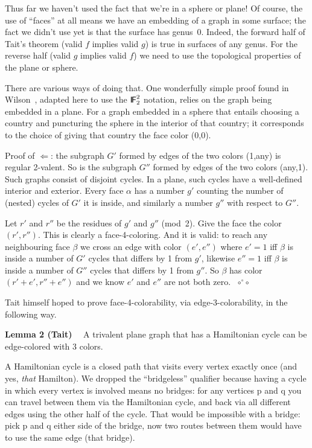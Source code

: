 \documentclass[12pt]{article}
\let\S\scriptstyle
\let\SS\scriptscriptstyle
\def\sfmath#1{{\mathchoice%
{{\sf #1}}{{\sf #1}}{{\S\sf #1}}{{\SS\sf #1}}}}
\def\Stalkset#1{\sfmath{I\kern-.12em#1}}
\def\Fset{\Stalkset F}
\let\os\Longleftarrow
\def\qed{ ${\S\circ}\!{}^\circ\!{\S\circ}$}
\begin{document}
Thus far we haven't used the fact that we're in a sphere or plane!
Of course, the use of ``faces'' at all means we have an embedding of a graph
in some surface; the fact we didn't use yet is that the surface has genus~0.
Indeed, the forward half of Tait's theorem (valid $f$ implies valid $g$)
is true in surfaces of any genus. For the reverse half (valid $g$ implies
valid $f$) we need to use the topological properties of the plane or sphere.

There are various ways of doing that. One wonderfully simple proof found in
Wilson~\cite{Wil02}, adapted here to use the $\Fset_2^2$ notation, relies on
the graph being embedded in a plane. For a graph embedded in a sphere that
entails choosing a country and puncturing the sphere in the interior of
that country; it corresponds to the choice of giving that country the face
color (0,0).

Proof of $\os$: the subgraph $G'$ formed by edges of the two colors (1,any)
is regular 2-valent. So is the subgraph $G''$ formed by edges of the two
colors (any,1). Such graphs consist of disjoint cycles. In a plane, such
cycles have a well-defined interior and exterior. Every face $\alpha$ has a
number $g'$ counting the number of (nested) cycles of $G'$ it is inside, and
similarly a number $g''$ with respect to $G''$.

Let $r'$ and $r''$ be the residues of $g'$ and $g''$ (mod~2). Give the face
the color $(r',r'')$. This is clearly a face-4-coloring. And it is valid:
to reach any neighbouring face $\beta$ we cross an edge with color $(e',e'')$
where $e'=1$ iff $\beta$ is inside a number of $G'$ cycles that differs by
1 from $g'$, likewise $e''=1$ iff $\beta$ is inside a number of $G''$ cycles
that differs by 1 from $g''$. So $\beta$ has color $(r'+e',r''+e'')$ and we
know $e'$ and $e''$ are not both zero.~\qed

\vfill\pagebreak
Tait himself hoped to prove face-4-colorability, via edge-3-colorability, in
the following way.

{\bf Lemma 2 (Tait)}$\quad$ A trivalent plane graph that has a Hamiltonian cycle can be edge-colored with 3 colors.

A Hamiltonian cycle is a closed path that visits every vertex exactly once
(and yes, {\em that\/} Hamilton). We dropped the ``bridgeless'' qualifier
because having a cycle in which every vertex is involved means no bridges:
for any vertices {\sc p} and {\sc q} you can travel between them via the
Hamiltonian cycle, and back via all different edges using the other half of
the cycle. That would be impossible with a bridge: pick {\sc p} and {\sc q}
either side of the bridge, now two routes between them would have to use the
same edge (that bridge).
\end{document}
